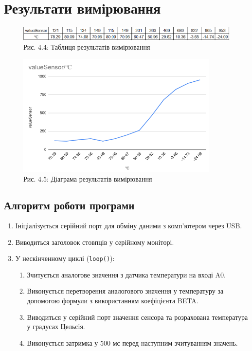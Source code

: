 \documentclass[a4paper]{article}
\begin{document}
\section*{Результати вимірювання}

\begin{figure}[h]
    \centering
    \includegraphics[width=1\textwidth]{imgs/LW4.2.png}
    \caption*{Рис. 4.4: Таблиця результатів вимірювання}
\end{figure} 


\begin{figure}[h]
    \centering
    \includegraphics[width=0.9\textwidth]{imgs/LW4.3.png}
    \caption*{Рис. 4.5: Діаграма результатів вимірювання}
\end{figure} 

\subsection*{Алгоритм роботи програми}
\begin{enumerate}
    \item Ініціалізується серійний порт для обміну даними з комп'ютером через USB.
    \item Виводиться заголовок стовпців у серійному моніторі.
    \item У нескінченному циклі (\texttt{loop()}):
    \begin{enumerate}
        \item Зчитується аналогове значення з датчика температури на вході A0.
        \item Виконується перетворення аналогового значення у температуру за допомогою формули з використанням коефіцієнта BETA.
        \item Виводиться у серійний порт значення сенсора та розрахована температура у градусах Цельсія.
        \item Виконується затримка у 500 мс перед наступним зчитуванням значень.
    \end{enumerate}
\end{enumerate}
\end{document}
